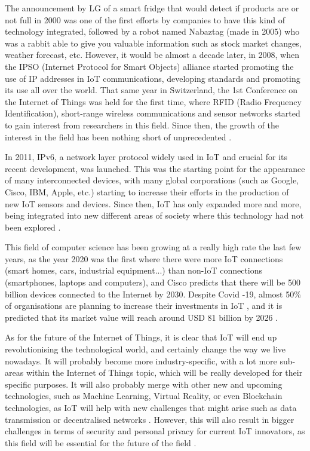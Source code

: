 \documentclass[12pt]{article}
\begin{document}
The announcement by LG of a smart fridge that would detect if products are or not full in 2000 was one of the first efforts by companies to have this kind of technology integrated, followed by a robot named Nabaztag (made in 2005) who was a rabbit able to give you valuable information such as stock market changes, weather forecast, etc. However, it would be almost a decade later, in 2008, when the IPSO (Internet Protocol for Smart Objects) alliance started promoting the use of IP addresses in IoT communications, developing standards and promoting its use all over the world. That same year in Switzerland, the 1st Conference on the Internet of Things was held for the first time, where RFID (Radio Frequency Identification), short-range wireless communications and sensor networks started to gain interest from researchers in this field. Since then, the growth of the interest in the field has been nothing short of unprecedented \cite{suresh}.\par

In 2011, IPv6, a network layer protocol widely used in IoT and crucial for its recent development, was launched. This was the starting point for the appearance of many interconnected devices, with many global corporations (such as Google, Cisco, IBM, Apple, etc.) starting to increase their efforts in the production of new IoT sensors and devices. Since then, IoT has only expanded more and more, being integrated into new different areas of society where this technology had not been explored \cite{itransition}.\par

This field of computer science has been growing at a really high rate the last few years, as the year 2020 was the first where there were more IoT connections (smart homes, cars, industrial equipment...) than non-IoT connections (smartphones, laptops and computers), and Cisco predicts that there will be 500 billion devices connected to the Internet by 2030. Despite Covid -19, almost 50\% of organisations are planning to increase their investments in IoT \cite{gartner:covid}, and it is predicted that its market value will reach around USD 81 billion by 2026 \cite{mordor}.\par 

As for the future of the Internet of Things, it is clear that IoT will end up revolutionising the technological world, and certainly change the way we live nowadays. It will probably become more industry-specific, with a lot more sub-areas within the Internet of Things topic, which will be really developed for their specific purposes. It will also probably merge with other new and upcoming technologies, such as Machine Learning, Virtual Reality, or even Blockchain technologies, as IoT will help with new challenges that might arise such as data transmission or decentralised networks \cite{itransition}. However, this will also result in bigger challenges in terms of security and personal privacy for current IoT innovators, as this field will be essential for the future of the field \cite{iot-wortmann}.
\end{document}
